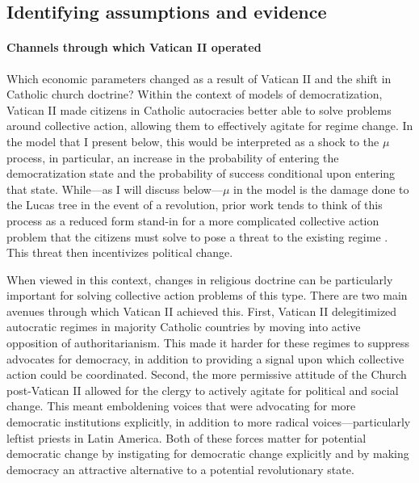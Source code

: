 \documentclass[12pt]{article}
\numberwithin{equation}{section}
\begin{document}
\subsection{Identifying assumptions and evidence}\label{section:identify_ass}

\paragraph{Channels through which Vatican II operated}

\label{par:model_link_beg}
Which economic parameters changed as a result of Vatican II and the shift in Catholic church doctrine? Within the context of models of democratization, Vatican II made citizens in Catholic autocracies better able to solve problems around collective action, allowing them to effectively agitate for regime change. In the model that I present below, this would be interpreted as a shock to the $\mu$ process, in particular, an increase in the probability of entering the democratization state and the probability of success conditional upon entering that state. While---as I will discuss below---$\mu$ in the model is the damage done to the Lucas tree in the event of a revolution, prior work tends to think of this process as a reduced form stand-in for a more complicated collective action problem that the citizens must solve to pose a threat to the existing regime \citep{Boix2003,Acemoglu2006}. This threat then incentivizes political change.

When viewed in this context, changes in religious doctrine can be particularly important for solving collective action problems of this type.  There are two main avenues through which Vatican II achieved this. First, Vatican II delegitimized autocratic regimes in majority Catholic countries by moving into active opposition of authoritarianism.  This made it harder for these regimes to suppress advocates for democracy, in addition to providing a signal upon which collective action could be coordinated. Second, the more permissive attitude of the Church post-Vatican II allowed for the clergy to actively agitate for political and social change. This meant emboldening voices that were advocating for more democratic institutions explicitly, in addition to more radical voices---particularly leftist priests in Latin America. Both of these forces matter for potential democratic change by instigating for democratic change explicitly and by making democracy an attractive alternative to a potential revolutionary state.
\label{par:model_link_end}
\end{document}
